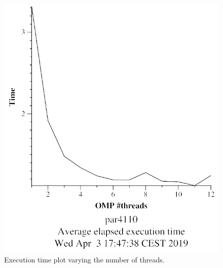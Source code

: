 \documentclass[12pt, a4paper]{article}
\begin{document}
\begin{figure}[H]
\centering
\begin{minipage}[b]{0.4\linewidth}
  \centering
  \includegraphics[scale=0.5]{./mandel-omp-10000-strong-22-time}
  \caption{Execution time plot varying the number of threads.}
  \label{fig:mandel-omp-10000-strong-22-time}
\end{minipage}%
\hspace{0.5cm}
\begin{minipage}[b]{0.4\linewidth}
  \centering

\end{minipage}
\end{figure}
\end{document}
